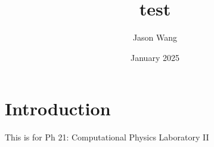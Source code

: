\documentclass{article}
\title{test}
\author{Jason Wang}
\date{January 2025}
\begin{document}
\maketitle

\section{Introduction}
This is for Ph 21: Computational Physics Laboratory II
\end{document}
